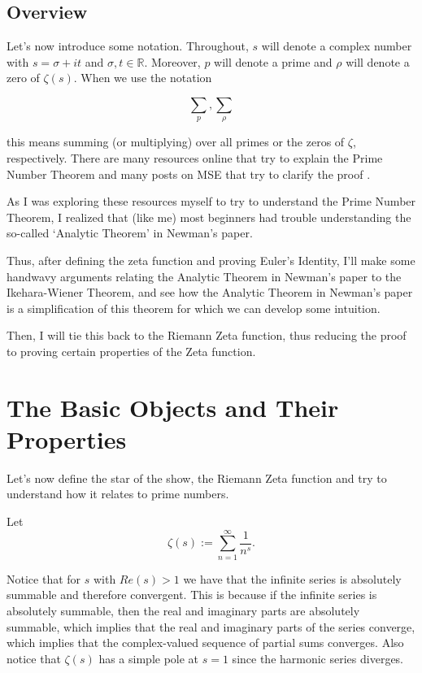 \documentclass{article}
\theoremstyle{definition}
\begin{document}
\subsection{Overview}

Let's now introduce some notation. Throughout, $ s $ will denote a complex number with $ s = \sigma + it $ and $ \sigma, t \in \mathbb{R} $.
Moreover, $ p $ will denote a prime and $ \rho $ will denote a zero of $ \zeta(s) $.
When we use the notation 

\[ \sum_{p}, \sum_{\rho}\]

this means summing (or multiplying) over all primes or the zeros of $ \zeta $, respectively.
There are many resources online that try to explain the Prime Number Theorem and many posts
on MSE that try to clarify the proof \cite{bandeira_complex_nodate} \cite{avi_why_2015} \cite{coffee_table_what_2018}. 

As I was exploring these resources myself to try to
understand the Prime Number Theorem, I realized that (like me) most beginners
had trouble understanding the so-called `Analytic Theorem' in Newman's paper.

Thus, after defining the zeta function and proving Euler's Identity, I'll
make some handwavy arguments relating the Analytic Theorem in Newman's paper
to the Ikehara-Wiener Theorem, and see how the Analytic Theorem in Newman's paper
is a simplification of this theorem for which we can develop some intuition.

Then, I will tie this back to the Riemann Zeta function, thus reducing the proof
to proving certain properties of the Zeta function. 

\section{The Basic Objects and Their Properties}

Let's now define the star of the show, the Riemann Zeta function and
try to understand how it relates to prime numbers.

Let \[ \zeta(s) := \sum_{n = 1}^{\infty} \frac{1}{n^{s}} .\] 

Notice that for $ s $ with $ Re(s) > 1 $ we have that the infinite series is absolutely
summable and therefore convergent. This is because if the infinite series is absolutely
summable, then the real and imaginary parts are absolutely summable, which implies that
the real and imaginary parts of the series converge, which implies that the complex-valued
sequence of partial sums converges. Also notice that $ \zeta(s) $ has a simple pole
at $ s = 1 $ since the harmonic series diverges. 
\end{document}
